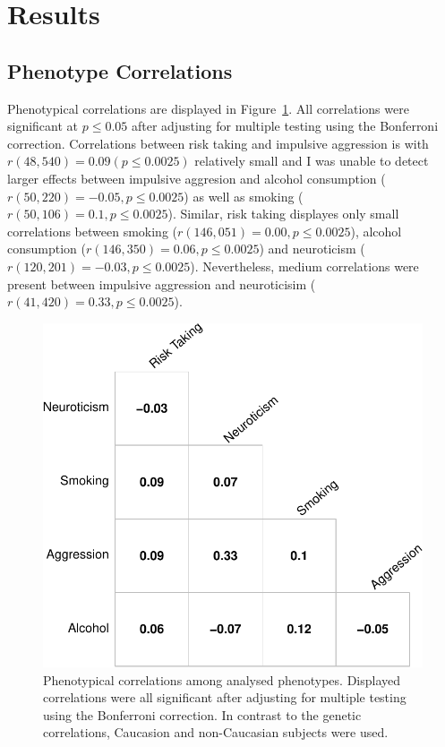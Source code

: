\section{Results}
\label{sec:results_ukb_assoc}

\subsection{Phenotype Correlations}
\label{sub:phenotype_correlations}

Phenotypical correlations are displayed in Figure~\ref{fig:corr_pheno}. 
All correlations were significant at $p\leq 0.05$ after adjusting for multiple testing using the Bonferroni correction.
Correlations between risk taking and impulsive aggression is with $r(48,540)=0.09 (p\leq0.0025)$ relatively small
and I was unable to detect larger effects between impulsive aggresion and alcohol consumption ($r(50,220)=-0.05, p\leq0.0025$)
as well as smoking ($r(50,106)=0.1, p\leq0.0025$).
Similar, risk taking displayes only small correlations between
smoking ($r(146,051)=0.00, p\leq0.0025$),
alcohol consumption ($r(146,350)=0.06, p\leq0.0025$)
and neuroticism ($r(120,201)=-0.03, p\leq0.0025$). 
Nevertheless, medium correlations were present between impulsive aggression and neuroticisim ($r(41,420)=0.33, p\leq0.0025$).

\begin{figure}[htpb]
  \centering
  \includegraphics[width=0.6\linewidth]{ukb_assoc/figure/phenotype/corr_plot_ci.pdf} 
  \caption{
    Phenotypical correlations among analysed phenotypes.
    Displayed correlations were all significant after adjusting for multiple testing using the Bonferroni correction.
    In contrast to the genetic correlations, Caucasion and non-Caucasian subjects were used.
  }\label{fig:corr_pheno}
\end{figure}

